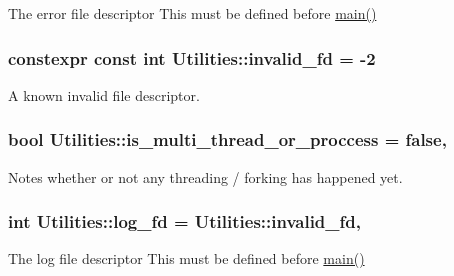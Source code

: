 The error file descriptor This must be defined before \hyperlink{shadow__stack_8cpp_a0ddf1224851353fc92bfbff6f499fa97}{main()} 

\hypertarget{class_utilities_a9633de25a993962a82210f566f2e98d5}{
\subsubsection[{invalid\-\_\-fd}]{\setlength{\rightskip}{0pt plus 5cm}constexpr const int Utilities\-::invalid\-\_\-fd = -\/2\hspace{0.3cm}{\ttfamily [static]}}}\label{class_utilities_a9633de25a993962a82210f566f2e98d5}


A known invalid file descriptor. 

\hypertarget{class_utilities_af893d8dcd5bb1ba3fc72fc108536bcbc}{
\subsubsection[{is\-\_\-multi\-\_\-thread\-\_\-or\-\_\-proccess}]{\setlength{\rightskip}{0pt plus 5cm}bool Utilities\-::is\-\_\-multi\-\_\-thread\-\_\-or\-\_\-proccess = false\hspace{0.3cm}{\ttfamily [static]}, {\ttfamily [private]}}}\label{class_utilities_af893d8dcd5bb1ba3fc72fc108536bcbc}


Notes whether or not any threading / forking has happened yet. 

\hypertarget{class_utilities_ab2b544c3e3a2b34a81703950c52a75a0}{
\subsubsection[{log\-\_\-fd}]{\setlength{\rightskip}{0pt plus 5cm}int Utilities\-::log\-\_\-fd = {\bf Utilities\-::invalid\-\_\-fd}\hspace{0.3cm}{\ttfamily [static]}, {\ttfamily [private]}}}\label{class_utilities_ab2b544c3e3a2b34a81703950c52a75a0}


The log file descriptor This must be defined before \hyperlink{shadow__stack_8cpp_a0ddf1224851353fc92bfbff6f499fa97}{main()} 

